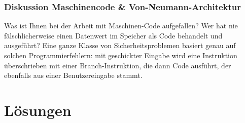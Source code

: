 \subsubsection{Diskussion Maschinencode \& Von-Neumann-Architektur}

Was ist Ihnen bei der Arbeit mit Maschinen-Code aufgefallen? Wer hat nie fälschlicherweise einen Datenwert im Speicher als Code behandelt und ausgeführt? Eine ganze Klasse von Sicherheitsproblemen basiert genau auf solchen Programmierfehlern: mit geschickter Eingabe wird eine Instruktion überschrieben mit einer Branch-Instruktion, die dann Code ausführt, der ebenfalls aus einer Benutzereingabe stammt.

\newpage

\section*{Lösungen}
\printsolutions




